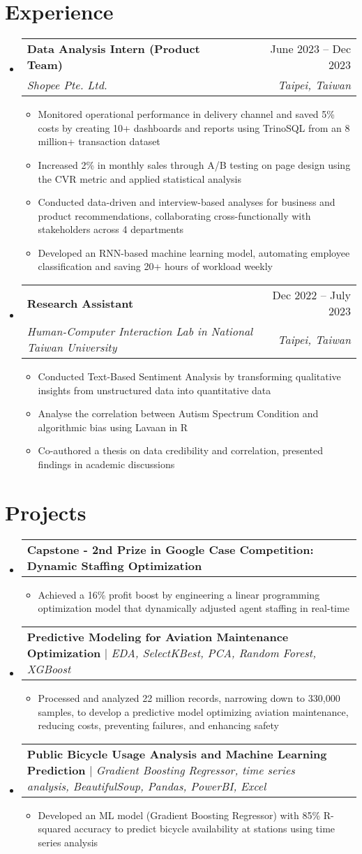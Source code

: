 \documentclass[letterpaper,11pt]{article}
\makeatletter
\newcommand{\resumeItem}[1]{
  \item\small{
    {#1 \vspace{-2pt}}
  }
}
\newcommand{\resumeSubheading}[4]{
  \vspace{-2pt}\item
    \begin{tabular*}{0.97\textwidth}[t]{l@{\extracolsep{\fill}}r}
      \textbf{#1} & #2 \\
      \textit{\small#3} & \textit{\small #4} \\
    \end{tabular*}\vspace{-7pt}
}
\newcommand{\resumeProjectHeading}[2]{
    \item
    \begin{tabular*}{0.97\textwidth}{l@{\extracolsep{\fill}}r}
      \small#1 & #2 \\
    \end{tabular*}\vspace{-7pt}
}
\newcommand{\resumeSubHeadingListStart}{\begin{itemize}[leftmargin=0.15in, label={}]}
\newcommand{\resumeSubHeadingListEnd}{\end{itemize}}
\newcommand{\resumeItemListStart}{\begin{itemize}}
\newcommand{\resumeItemListEnd}{\end{itemize}\vspace{-5pt}}
\makeatother
\begin{document}
\section{Experience}
  \resumeSubHeadingListStart
    \resumeSubheading
      {Data Analysis Intern (Product Team)}{June 2023 -- Dec 2023}
      {Shopee Pte. Ltd.}{Taipei, Taiwan}
      \resumeItemListStart
        \resumeItem{Monitored operational performance in delivery channel and saved 5\% costs by creating 10+ dashboards and reports using TrinoSQL from an 8 million+ transaction dataset}
        \resumeItem{Increased 2\% in monthly sales through A/B testing on page design using the CVR metric and applied statistical analysis}
        \resumeItem{Conducted data-driven and interview-based analyses for business and product recommendations, collaborating cross-functionally with stakeholders across 4 departments}
        \resumeItem{Developed an RNN-based machine learning model, automating employee classification and saving 20+ hours of workload weekly}
      \resumeItemListEnd
    \resumeSubheading
      {Research Assistant}{Dec 2022 -- July 2023}
      {Human-Computer Interaction Lab in National Taiwan University}{Taipei, Taiwan}
      \resumeItemListStart
        \resumeItem{Conducted Text-Based Sentiment Analysis by transforming qualitative insights from unstructured data into quantitative data}
        \resumeItem{Analyse the correlation between Autism Spectrum Condition and algorithmic bias using Lavaan in R}
        \resumeItem{Co-authored a thesis on data credibility and correlation, presented findings in academic discussions}
      \resumeItemListEnd
  \resumeSubHeadingListEnd

\section{Projects}
    \resumeSubHeadingListStart
      \resumeProjectHeading
          {\textbf{Capstone - 2nd Prize in Google Case Competition: Dynamic Staffing Optimization}}{}
          \resumeItemListStart
            \resumeItem{Achieved a 16\% profit boost by engineering a linear programming optimization model that dynamically adjusted agent staffing in real-time}
          \resumeItemListEnd
      \resumeProjectHeading
          {\textbf{Predictive Modeling for Aviation Maintenance Optimization} $|$ \emph{EDA, SelectKBest, PCA, Random Forest, XGBoost}}{}
          \resumeItemListStart
            \resumeItem{Processed and analyzed 22 million records, narrowing down to 330,000 samples, to develop a predictive model optimizing aviation maintenance, reducing costs, preventing failures, and enhancing safety}
          \resumeItemListEnd
      \resumeProjectHeading
          {\textbf{Public Bicycle Usage Analysis and Machine Learning Prediction} $|$ \emph{Gradient Boosting Regressor, time series analysis, BeautifulSoup, Pandas, PowerBI, Excel}}{}
          \resumeItemListStart
            \resumeItem{Developed an ML model (Gradient Boosting Regressor) with 85\% R-squared accuracy to predict bicycle availability at stations using time series analysis}
          \resumeItemListEnd
    \resumeSubHeadingListEnd
\end{document}
